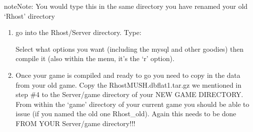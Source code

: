 \documentclass[letterpaper,10pt,english]{sphinxmanual}
\begin{document}
\begin{sphinxadmonition}{note}{Note:}
\sphinxAtStartPar
You would type this in the same directory you have renamed your old ‘Rhost’ directory
\end{sphinxadmonition}
\begin{enumerate}
%
\setcounter{enumi}{6}
\item {} 
\sphinxAtStartPar
go into the Rhost/Server directory.   Type:

\begin{sphinxVerbatim}[commandchars=\\\{\}]
 
\end{sphinxVerbatim}

\sphinxAtStartPar
Select what options you want (including the mysql and other goodies) then compile it (also within the menu, it’s the ‘r’ option).

\item {} 
\sphinxAtStartPar
Once your game is compiled and ready to go you need to copy in the data from your old game.  Copy the RhostMUSH.dbflat1.tar.gz we mentioned in step \#4 to the Server/game directory of your NEW GAME DIRECTORY.  From within the ‘game’ directory of your current game you should be able to issue (if you named the old one Rhost\_old). Again this needs to be done FROM YOUR Server/game directory!!!

\end{enumerate}
\end{document}
